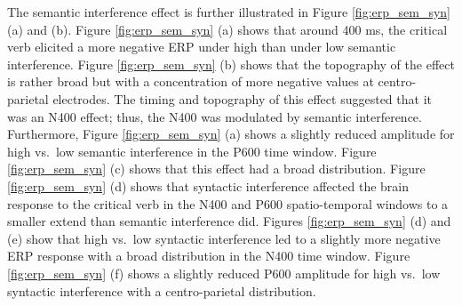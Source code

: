 \documentclass[review,preprint,12pt,authoryear,floatsintext]{elsarticle}
\begin{document}
The semantic interference effect is further illustrated in Figure \ref{fig:erp_sem_syn} (a) and (b). Figure \ref{fig:erp_sem_syn} (a) shows that around 400 ms, the critical verb elicited a more negative ERP under high than under low semantic interference. Figure \ref{fig:erp_sem_syn} (b) shows that the topography of the effect is rather broad but with a concentration of more negative values at centro-parietal electrodes. The timing and topography of this effect suggested that it was an N400 effect; thus, the N400 was modulated by semantic interference. Furthermore, Figure \ref{fig:erp_sem_syn} (a) shows a slightly reduced amplitude for high vs.\ low semantic interference in the P600 time window. Figure \ref{fig:erp_sem_syn} (c) shows that this effect had a broad distribution. {Figure \ref{fig:erp_sem_syn} (d) shows that syntactic interference affected the brain response to the critical verb in the N400 and P600 spatio-temporal windows to a smaller extend than semantic interference did. Figures \ref{fig:erp_sem_syn} (d) and (e) show that high vs.\ low syntactic interference led to a slightly more negative ERP response with a broad distribution in the N400 time window. Figure  \ref{fig:erp_sem_syn} (f) shows a slightly reduced P600 amplitude for high vs.\ low syntactic interference with a centro-parietal distribution. }\label{ERP_results2}
\end{document}
